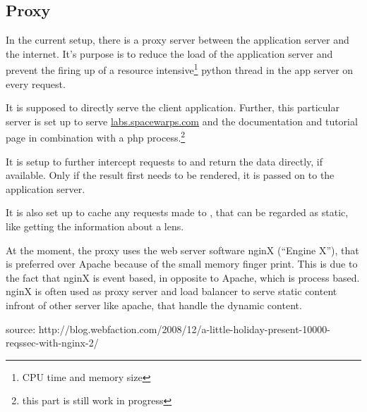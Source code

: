 \subsection{Proxy}
\label{sec:proxy}

In the current setup, there is a proxy server between the application server and the internet.
It's purpose is to reduce the load of the application server and prevent the firing up of a resource intensive\footnote{CPU time and memory size} python thread in the app server on every request.

It is supposed to directly serve the client application. Further, this particular server is set up to serve \url{labs.spacewarps.com} and the \spl documentation and tutorial page in combination with a php process.\footnote{this part is still work in progress}

It is setup to further intercept requests to  and return the data directly, if available.
Only if the result first needs to be rendered, it is passed on to the application server.

It is also set up to cache any requests made to , that can be regarded as static, like getting the information about a lens.

At the moment, the proxy uses the web server software nginX (``Engine X''), that is preferred over Apache because of the small memory finger print.
This is due to the fact that nginX is event based, in opposite to Apache, which is process based.
nginX is often used as proxy server and load balancer to serve static content infront of other server like apache, that handle the dynamic content.

source:
http://blog.webfaction.com/2008/12/a-little-holiday-present-10000-reqssec-with-nginx-2/


